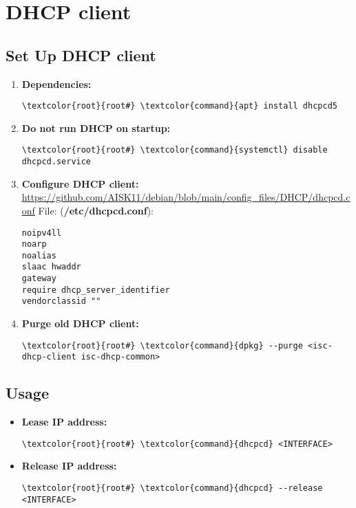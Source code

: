 \documentclass[10pt, a4paper, onecolumn, openany]{book} %
\begin{document}
\section{DHCP client}
\subsection{Set Up DHCP client}
\begin{enumerate}
    \item \textbf{Dependencies:}
\begin{Verbatim}[commandchars=\\\{\}]
\textcolor{root}{root#} \textcolor{command}{apt} install dhcpcd5
\end{Verbatim}
    \item \textbf{Do not run DHCP on startup:}
\begin{Verbatim}[commandchars=\\\{\}]
\textcolor{root}{root#} \textcolor{command}{systemctl} disable dhcpcd.service
\end{Verbatim}
    \item \textbf{Configure DHCP client:}
\newline \underline{\url{https://github.com/AISK11/debian/blob/main/config_files/DHCP/dhcpcd.conf}}
\newline File: (\textbf{\textcolor{file}{/etc/dhcpcd.conf}}):
\begin{Verbatim}[commandchars=\\\{\}]
noipv4ll
noarp
noalias
slaac hwaddr
gateway
require dhcp_server_identifier
vendorclassid ""
\end{Verbatim}
    \item \textbf{Purge old DHCP client:}
\begin{Verbatim}[commandchars=\\\{\}]
\textcolor{root}{root#} \textcolor{command}{dpkg} --purge <isc-dhcp-client isc-dhcp-common>
\end{Verbatim}
\end{enumerate}
\subsection{Usage}
\begin{itemize}
    \item \textbf{Lease IP address:}
\begin{Verbatim}[commandchars=\\\{\}]
\textcolor{root}{root#} \textcolor{command}{dhcpcd} <INTERFACE>
\end{Verbatim}
    \item \textbf{Release IP address:}
\begin{Verbatim}[commandchars=\\\{\}]
\textcolor{root}{root#} \textcolor{command}{dhcpcd} --release <INTERFACE>
\end{Verbatim}
\end{itemize}
\end{document}
